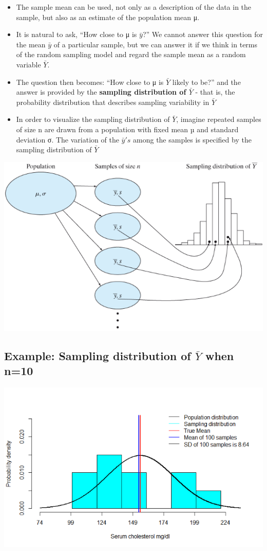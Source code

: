 \documentclass[
]{book}
\providecommand{\tightlist}{%
  \setlength{\itemsep}{0pt}\setlength{\parskip}{0pt}}
\begin{document}
\begin{itemize}
\tightlist
\item
  The sample mean can be used, not only as a description of the data in the sample, but also as an estimate of the population mean μ.
\item
  It is natural to ask, ``How close to μ is \(\bar y\)?'' We cannot answer this question for the mean \(\bar y\) of a particular sample, but we can answer it if we think in terms of the random sampling model and regard the sample mean as a random variable \(\bar Y\).
\item
  The question then becomes: ``How close to μ is \(\bar Y\) likely to be?'' and the answer is provided by the \textbf{sampling distribution of \(\bar Y\)} - that is, the probability distribution that describes sampling variability in \(\bar Y\)
\item
  In order to visualize the sampling distribution of \(\bar Y\), imagine repeated samples of size n are drawn from a population with fixed mean µ and standard deviation σ. The variation of the \(\bar y's\) among the samples is specified by the sampling distribution of \(\bar Y\)
\end{itemize}

\includegraphics[width=0.5\linewidth]{./3_23}

\hypertarget{example-sampling-distribution-of-bar-y-when-n10}{%
\subsection{\texorpdfstring{Example: Sampling distribution of \(\bar Y\) when n=10}{Example: Sampling distribution of \textbackslash bar Y when n=10}}\label{example-sampling-distribution-of-bar-y-when-n10}}

\includegraphics[width=0.5\linewidth]{./3_24}
\end{document}
